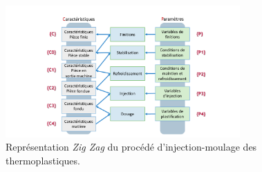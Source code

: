 \begin{figure}[htbp]
	\centering
	\includegraphics[width=0.80\textwidth,height=\textheight,keepaspectratio]{../Chap1/Figures/Sapristi_ZigZag.pdf}
	\caption{Représentation \textit{Zig Zag} du procédé d'injection-moulage des thermoplastiques.}
	\label{fig:annexe_zigzag}
\end{figure}


